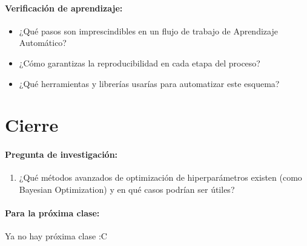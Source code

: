 \documentclass[a4,11pt]{aleph-notas}
\begin{document}
\paragraph{Verificación de aprendizaje:}  
\begin{itemize}[leftmargin=*]
    \item ¿Qué pasos son imprescindibles en un flujo de trabajo de Aprendizaje Automático?
    \item ¿Cómo garantizas la reproducibilidad en cada etapa del proceso?
    \item ¿Qué herramientas y librerías usarías para automatizar este esquema?
\end{itemize}



\section*{Cierre}

\paragraph{Pregunta de investigación:}  
\begin{enumerate}[leftmargin=*]
    \item ¿Qué métodos avanzados de optimización de hiperparámetros existen (como Bayesian Optimization) y en qué casos podrían ser útiles?
\end{enumerate}
    
\paragraph{Para la próxima clase:}  
Ya no hay próxima clase :C
\end{document}
